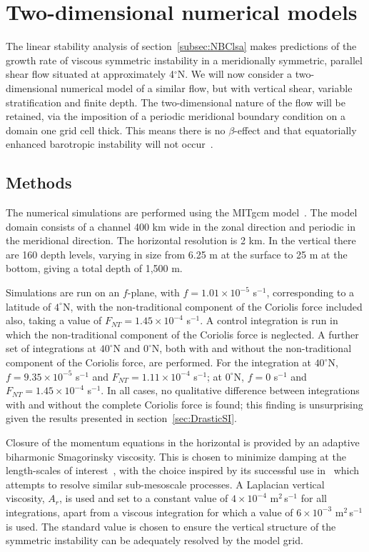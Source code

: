 \section{Two-dimensional numerical models}
The linear stability analysis of section~\ref{subsec:NBClsa} makes predictions of the growth rate of viscous symmetric instability in a meridionally symmetric, parallel shear flow situated at approximately 4$^\circ$N. We will now consider a two-dimensional numerical model of a similar flow, but with vertical shear, variable stratification and finite depth. The two-dimensional nature of the flow will be retained, via the imposition of a periodic meridional boundary condition on a domain one grid cell thick. This means there is no $\beta$-effect and that equatorially enhanced barotropic instability will not occur~\citep{Edwards1998I,Edwards1998II}.

\subsection{Methods}
\label{subsec:2DMethods}
The numerical simulations are performed using the MITgcm model~\citep{Marshall1997}. The model domain consists of a channel 400 km wide in the zonal direction and periodic in the meridional direction. The horizontal resolution is 2 km. In the vertical there are 160 depth levels, varying in size from 6.25 m at the surface to 25 m at the bottom, giving a total depth of 1,500 m.

Simulations are run on an $f$-plane, with $f = 1.01 \times 10 ^{-5}$ s$^{-1}$, corresponding to a latitude of $4^\circ$N, with the non-traditional component of the Coriolis force included also, taking a value of $F_{NT} = 1.45 \times 10^{-4}$ s$^{-1}$. A control integration is run in which the non-traditional component of the Coriolis force is neglected. A further set of integrations at $40^\circ$N and $0^\circ$N, both with and without the non-traditional component of the Coriolis force, are performed. For the integration at $40^\circ$N, $f = 9.35 \times 10^{-5} $ s$^{-1}$ and $F_{NT} = 1.11 \times 10^{-4}$ s$^{-1}$; at $0^\circ$N, $f = 0$ s$^{-1}$ and $F_{NT} = 1.45 \times 10^{-4}$ s$^{-1}$. In all cases, no qualitative difference between integrations with and without the complete Coriolis force is found; this finding is unsurprising given the results presented in section~\ref{sec:DrasticSI}.

Closure of the momentum equations in the horizontal is provided by an adaptive biharmonic Smagorinsky viscosity. This is chosen to minimize damping at the  length-scales of interest~\citep{Smagorinsky1963, Griffies2000}, with the choice inspired by its successful use in~\citet{Brannigan2016} which attempts to resolve similar sub-mesoscale processes. A Laplacian vertical viscosity, $A_r$, is used and set to a constant value of $4 \times 10^{-4}$ m$^2$\,s$^{-1}$ for all integrations, apart from a viscous integration for which a value of $6 \times 10^{-3}$ m$^2$\,s$^{-1}$ is used. The standard value is chosen to ensure the vertical structure of the symmetric instability can be adequately resolved by the model grid.

